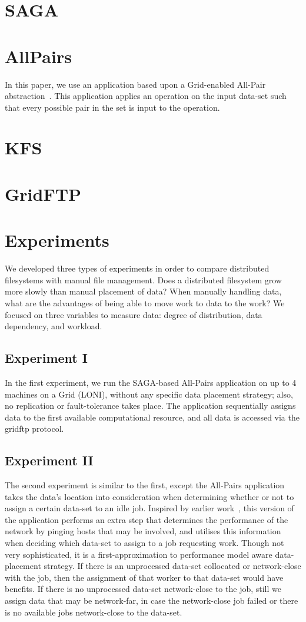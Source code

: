 \documentclass{rspublic}
\begin{document}
\section{SAGA}
\section{AllPairs}
In this paper, we use an application based upon a Grid-enabled All-Pair
abstraction~\citep{Interop, AllPairs}. This application applies an
operation on the input data-set such that every possible pair in the set
is input to the operation. 
\section{KFS} \section{GridFTP}
\section{Experiments} We developed three types of experiments in order
to compare distributed filesystems with manual file management.  Does a
distributed filesystem grow more slowly than manual placement of data?
When manually handling data, what are the advantages of being able to
move work to data to the work?  We focused on three variables to measure
data:  degree of distribution, data dependency, and workload.

\subsection{Experiment I} In the first experiment, we run the SAGA-based
All-Pairs application on up to 4 machines on a Grid (LONI), without any
specific data placement strategy; also, no replication or
fault-tolerance takes place. The application sequentially assigns data
to the first available computational resource, and all data is accessed
via the gridftp protocol.
\subsection{Experiment II} The second experiment is similar to the
first, except the All-Pairs application takes the data's location into
consideration when determining whether or not to assign a certain
data-set to an idle job. Inspired by earlier work~\citep{netperf}, this
version of the application performs an extra step that determines the
performance of the network by pinging hosts that may be involved, and
utilises this information when deciding which data-set to assign to a
job requesting work. Though not very sophisticated, it is a
first-approximation to performance model aware data-placement strategy.
If there is an unprocessed data-set collocated or network-close with the
job, then the assignment of that worker to that data-set would have
benefits. If there is no unprocessed data-set network-close to the job,
still we assign data that may be network-far, in case the network-close
job failed or there is no available jobs network-close to the data-set.
\end{document}
